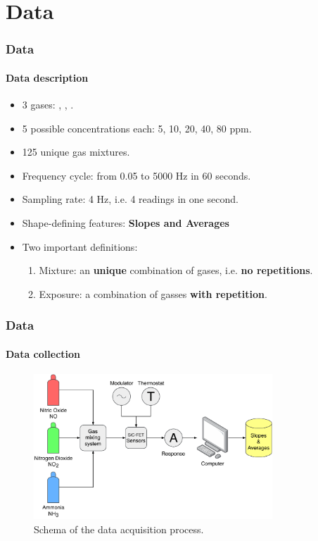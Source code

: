 \documentclass{beamer}
\begin{document}
\section{Data}
\begin{frame}
	\frametitle{Data}
	\framesubtitle{Data description}
	
	\begin{itemize}
		\item 3 gases:  , , .
		\item 5 possible concentrations each: 5, 10, 20, 40, 80 ppm.
		\item 125 unique gas mixtures.
		\item Frequency cycle: from 0.05 to 5000 Hz in 60 seconds.
		\item Sampling rate: 4 Hz, i.e. 4 readings in one second.
		\item Shape-defining features: \textbf{Slopes and Averages}
		\item Two important definitions:
		\begin{enumerate}
			\item Mixture: an \textbf{unique} combination of gases, i.e. \textbf{no repetitions}.
			\item Exposure: a combination of gasses \textbf{with repetition}.
		\end{enumerate}
	
\end{itemize}
\end{frame}

\begin{frame}
	\frametitle{Data}
	\framesubtitle{Data collection}
	
	\begin{figure}[!htb]
		\centering
		\includegraphics[width=0.8\textwidth]{../../figures/experimental-setup.pdf}
		\caption{Schema of the data acquisition process.}
	\end{figure}
\end{frame}
\end{document}
